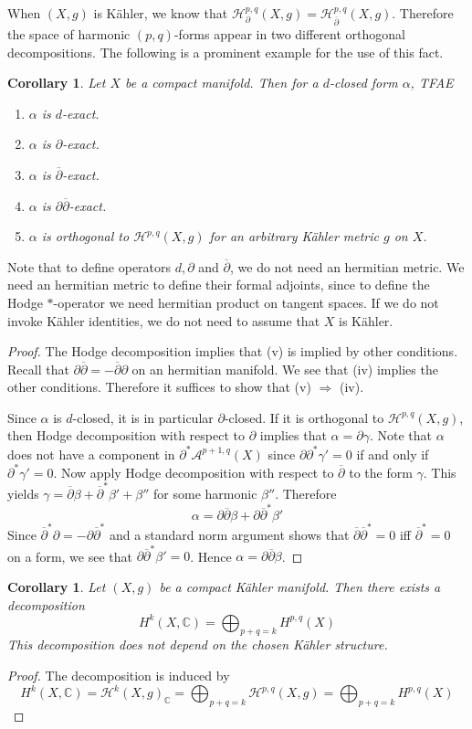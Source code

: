 \documentclass[12pt]{article}
\theoremstyle{plain}
\newtheorem{corollary}[equation]{Corollary}
\theoremstyle{definition}
\newcommand{\IC}{\mathbb{C}}
\newcommand{\<}{\langle}
\renewcommand{\>}{\rangle}
\newcommand{\p}{\partial}
\newcommand{\sH}{\mathcal{H}}
\newcommand{\bp}{\overline{\p}}
\newcommand{\sA}{\mathcal{A}}
\begin{document}
When $(X, g)$ is K{\"a}hler, we know that $\sH_\p^{p, q} (X, g) = \sH_{\bp}^{p, q} (X, g)$.  Therefore the space of harmonic $(p, q)$-forms appear in two different orthogonal decompositions. The following is a prominent example for the use of this fact.  
\begin{corollary}
Let $X$ be a compact manifold. Then for a $d$-closed form $\alpha$, TFAE
\begin{enumerate}[label=\roman*.]
\item $\alpha$ is $d$-exact. 
\item $\alpha$ is $\p$-exact.
\item $\alpha$ is $\bp$-exact. 
\item $\alpha$ is $\p \bp$-exact. 
\item $\alpha$ is orthogonal to $\sH^{p, q}(X, g)$ for an arbitrary K{\"a}hler metric $g$ on $X$.  
\end{enumerate}
\end{corollary}
Note that to define operators $d, \p$ and $\bp$, we do not need an hermitian metric. We need an hermitian metric to define their formal adjoints, since to define the Hodge $*$-operator we need hermitian product on tangent spaces. If we do not invoke K{\"a}hler identities, we do not need to assume that $X$ is K{\"a}hler.

\begin{proof}
The Hodge decomposition implies that (v) is implied by other conditions. Recall that $\p \bp = - \bp \p$ on an hermitian manifold. We see that (iv) implies the other conditions. Therefore it suffices to show that (v) $\Rightarrow$ (iv).  

Since $\alpha$ is $d$-closed, it is in particular $\p$-closed. If it is orthogonal to $\sH^{p, q}(X, g)$, then Hodge decomposition with respect to $\p$ implies that $\alpha = \p \gamma$. Note that $\alpha$ does not have a component in $\p^* \sA^{p + 1, q}(X) $ since $\p \p^* \gamma' = 0$ if and only if $\p^* \gamma' = 0$. Now apply Hodge decomposition with respect to $\bp$ to the form $\gamma$. This yields $\gamma = \bp \beta + \bp^* \beta' + \beta''$ for some harmonic $\beta''$. Therefore 
$$  \alpha = \p \bp \beta + \p \bp^* \beta' $$
Since $\bp^* \p = - \p \bp^*$ and a standard norm argument shows that $\bp \bp^* = 0$ iff $\bp^* = 0$ on a form, we see that $\p \bp^* \beta' = 0$. Hence $\alpha = \p \bp \beta$. 
\end{proof} 


\begin{corollary}
Let $(X, g)$ be a compact K{\"a}hler manifold. Then there exists a decomposition 
$$ H^k(X, \IC) = \bigoplus_{p + q = k} H^{p, q}(X) $$
This decomposition does not depend on the chosen K{\"a}hler structure. 
\end{corollary}
\begin{proof}
The decomposition is induced by 
$$ H^k(X, \IC) = \sH^k(X, g)_\IC = \bigoplus_{p + q = k} \sH^{p, q}(X, g) = \bigoplus_{p + q = k} H^{p, q}(X) $$
\end{proof}
\end{document}
